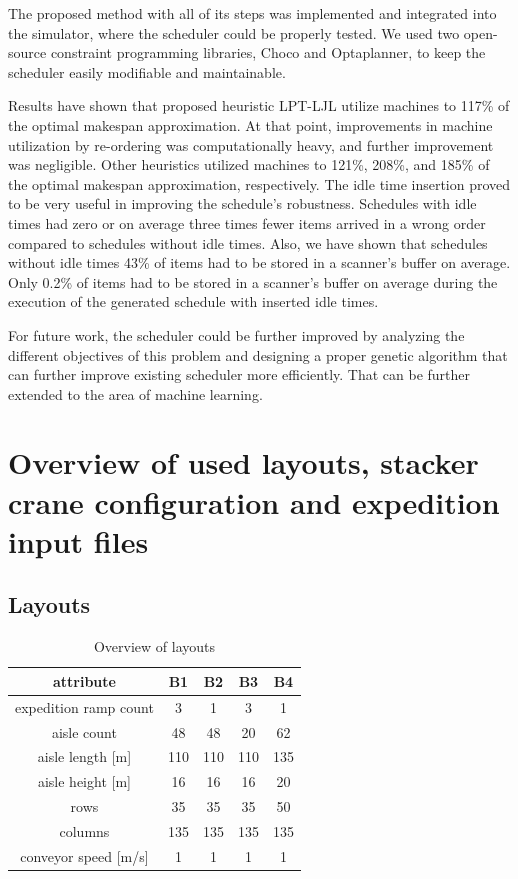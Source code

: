 \documentclass{ctuthesis}
\begin{document}
The proposed method with all of its steps was implemented and integrated into the simulator, where the scheduler could be properly tested. We used two open-source constraint programming libraries, Choco and Optaplanner, to keep the scheduler easily modifiable and maintainable.

Results have shown that proposed heuristic LPT-LJL utilize machines to 117\% of the optimal makespan approximation. At that point, improvements in machine utilization by re-ordering was computationally heavy, and further improvement was negligible. Other heuristics utilized machines to 121\%, 208\%, and 185\% of the optimal makespan approximation, respectively. The idle time insertion proved to be very useful in improving the schedule's robustness. Schedules with idle times had zero or on average three times fewer items arrived in a wrong order compared to schedules without idle times. Also, we have shown that schedules without idle times 43\% of items had to be stored in a scanner's buffer on average. Only 0.2\% of items had to be stored in a scanner's buffer on average during the execution of the generated schedule with inserted idle times.

For future work, the scheduler could be further improved by analyzing the different objectives of this problem and designing a proper genetic algorithm that can further improve existing scheduler more efficiently. That can be further extended to the area of machine learning.






\appendix

\chapter{Overview of used layouts, stacker crane configuration and expedition input files}

\section{Layouts}

\begin{table}[H]
\begin{tabular}{ |c|| c | c | c | c |} 
\hline
attribute & B1 & B2 & B3 & B4\\ 
\hline
expedition ramp count & 3 & 1 & 3 & 1 \\
\hline
aisle count & 48 & 48 & 20 & 62\\
\hline
aisle length [m] &  110 & 110 & 110 & 135\\
\hline
aisle height [m] & 16 & 16 & 16 & 20\\
\hline
rows & 35 & 35 & 35 & 50\\ 
\hline
columns & 135 & 135 & 135 & 135\\ 
\hline
conveyor speed [m/s] & 1 & 1 & 1 & 1\\ 
\hline
\end{tabular}
\caption{Overview of layouts} \label{tab:layoutoverview}
\end{table}
\end{document}
